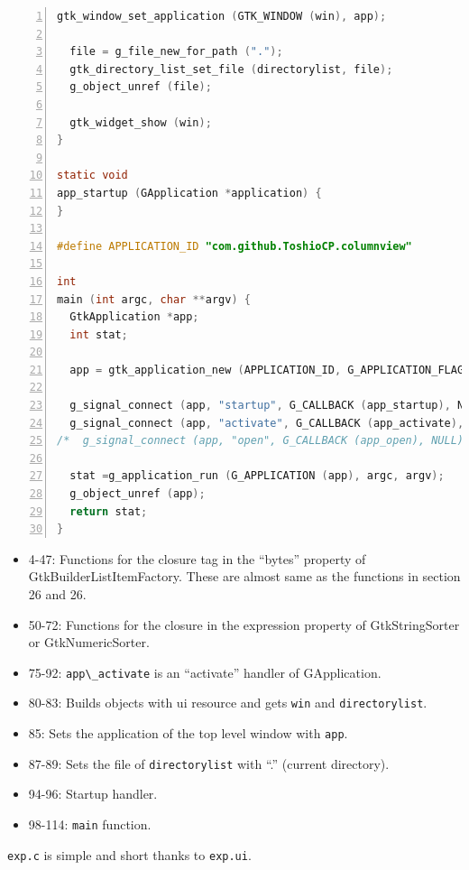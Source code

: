 \begin{lstlisting}[language=C, numbers=left]
  gtk_window_set_application (GTK_WINDOW (win), app);

  file = g_file_new_for_path (".");
  gtk_directory_list_set_file (directorylist, file);
  g_object_unref (file);

  gtk_widget_show (win);
}

static void
app_startup (GApplication *application) {
}

#define APPLICATION_ID "com.github.ToshioCP.columnview"

int
main (int argc, char **argv) {
  GtkApplication *app;
  int stat;

  app = gtk_application_new (APPLICATION_ID, G_APPLICATION_FLAGS_NONE);

  g_signal_connect (app, "startup", G_CALLBACK (app_startup), NULL);
  g_signal_connect (app, "activate", G_CALLBACK (app_activate), NULL);
/*  g_signal_connect (app, "open", G_CALLBACK (app_open), NULL);*/

  stat =g_application_run (G_APPLICATION (app), argc, argv);
  g_object_unref (app);
  return stat;
}
\end{lstlisting}

\begin{itemize}
\tightlist
\item
  4-47: Functions for the closure tag in the ``bytes'' property of
  GtkBuilderListItemFactory. These are almost same as the functions in
  section 26 and 26.
\item
  50-72: Functions for the closure in the expression property of
  GtkStringSorter or GtkNumericSorter.
\item
  75-92: \passthrough{\lstinline!app\_activate!} is an ``activate''
  handler of GApplication.
\item
  80-83: Builds objects with ui resource and gets
  \passthrough{\lstinline!win!} and
  \passthrough{\lstinline!directorylist!}.
\item
  85: Sets the application of the top level window with
  \passthrough{\lstinline!app!}.
\item
  87-89: Sets the file of \passthrough{\lstinline!directorylist!} with
  ``.'' (current directory).
\item
  94-96: Startup handler.
\item
  98-114: \passthrough{\lstinline!main!} function.
\end{itemize}

\passthrough{\lstinline!exp.c!} is simple and short thanks to
\passthrough{\lstinline!exp.ui!}.

